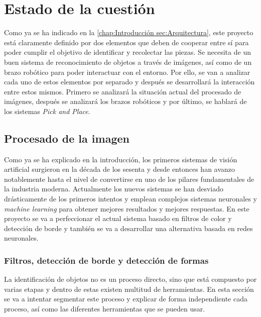 \chapter{Estado de la cuestión}
\label{chap:Estado de la cuestion}

Como ya se ha indicado en la \autoref{chap:Introducción sec:Arquitectura}, este proyecto está claramente definido por dos elementos que deben de cooperar entre sí para poder cumplir el objetivo de identificar y recolectar las piezas. Se necesita de un buen sistema de reconocimiento de objetos a través de imágenes, así como de un brazo robótico para poder interactuar con el entorno. Por ello, se van a analizar cada uno de estos elementos por separado y después se desarrollará la interacción entre estos mismos. Primero se analizará la situación actual del procesado de imágenes, después se analizará los brazos robóticos y por último, se hablará de los sistemas \textit{Pick and Place}.

\section{Procesado de la imagen}
\label{chap:Estado de la cuestion sec:Procesado de la imagen}
Como ya se ha explicado en la introducción, los primeros sistemas de visión artificial surgieron en la década de los sesenta y desde entonces han avanzo notablemente hasta el nivel de convertirse en uno de los pilares fundamentales de la industria moderna. Actualmente los nuevos sistemas se han desviado drásticamente de los primeros intentos y emplean complejos sistemas neuronales y \textit{machine learning} para obtener mejores resultados y mejores respuestas. En este proyecto se va a perfeccionar el actual sistema basado en filtros de color y detección de borde y también se va a desarrollar una alternativa basada en redes neuronales.

\subsection{Filtros, detección de borde y detección de formas}
\label{chap:Estado de la cuestion sec:Procesado de la imagen subsec:Filtros, detección de borde y detección de formas}
La identificación de objetos no es un proceso directo, sino que está compuesto por varias etapas y dentro de estas existen multitud de herramientas. En esta sección se va a intentar segmentar este proceso y explicar de forma independiente cada proceso, así como las diferentes herramientas que se pueden usar.


